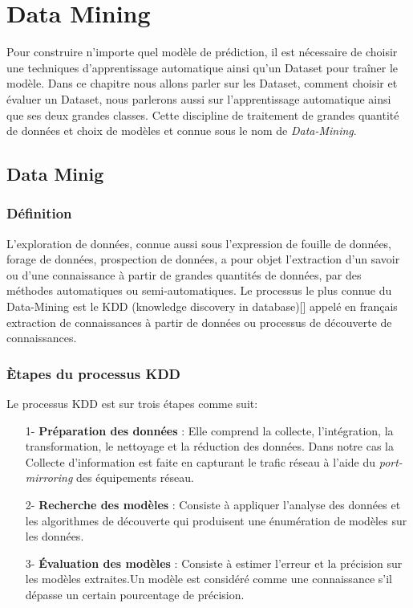 \chapter{Data Mining}

\label{Chapter3} 
Pour construire n'importe quel modèle de prédiction, il est nécessaire de choisir une techniques d'apprentissage automatique ainsi qu'un Dataset pour traîner le modèle. Dans ce chapitre nous allons parler sur les Dataset, comment choisir et évaluer un Dataset, nous parlerons aussi sur l’apprentissage automatique ainsi que ses deux grandes classes. Cette discipline de traitement de grandes quantité de données et choix de modèles et connue sous le nom de \textit{Data-Mining}.

\section{Data Minig}
\subsection{Définition}
L’exploration de données, connue aussi sous l’expression de fouille de données, forage de données, prospection de données, a pour objet l’extraction d’un savoir ou d’une connaissance à partir de grandes quantités de données, par des méthodes automatiques ou semi-automatiques. Le processus le plus connue du Data-Mining est le KDD (knowledge discovery in database)[\cite{11}] appelé en français extraction de connaissances à partir de données ou processus de découverte de connaissances.

\subsection{Ètapes du processus KDD}
Le processus KDD est sur trois étapes comme suit:\\
\begin{itemize}
\item[1-]\textbf{Préparation des données} : Elle comprend la collecte, l'intégration, la transformation, le nettoyage et la réduction des données. Dans notre cas la Collecte d'information est faite en capturant le trafic réseau à l'aide du \textit{port-mirroring} des équipements réseau.\\
\item[2-]\textbf{Recherche des modèles} : Consiste à appliquer l'analyse des données et les algorithmes de découverte qui produisent une énumération de modèles sur les données.\\
\item[3-]\textbf{Évaluation des modèles} : Consiste à estimer l'erreur et la précision sur les modèles extraites.Un modèle est considéré comme une connaissance s'il dépasse un certain pourcentage de précision.
\end{itemize}

